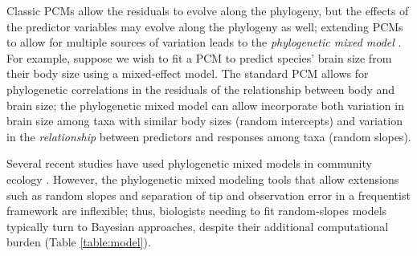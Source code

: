 \documentclass[12pt]{article}
\begin{document}
Classic PCMs allow the residuals to evolve along the phylogeny, but the effects of the predictor variables may evolve along the phylogeny as well; extending PCMs to allow for multiple sources of variation leads to the  \emph{phylogenetic mixed model} \citep{housworth2004phylogenetic}.
For example, suppose we wish to fit a PCM to predict species' brain size from their body size \cite{felsenstein1985phylogenies} using a mixed-effect model.
The standard PCM allows for phylogenetic correlations in the residuals of the relationship between body and brain size; the phylogenetic mixed model can allow incorporate both
variation in brain size among taxa with similar body sizes (random intercepts) and
variation in the \emph{relationship} between predictors and responses among taxa (random slopes).

Several recent studies have used phylogenetic mixed models in
community ecology \citep{nowakowski2018phylogenetic, li2017canfun}.
However, the phylogenetic mixed modeling tools that allow extensions such as random slopes
and separation of tip and observation error in a frequentist framework are inflexible; thus, biologists needing to fit random-slopes models typically turn to Bayesian approaches, despite their additional computational burden \citep{hadfield2010mcmc, burkner2018brms} (Table \ref{table:model}).
\end{document}
